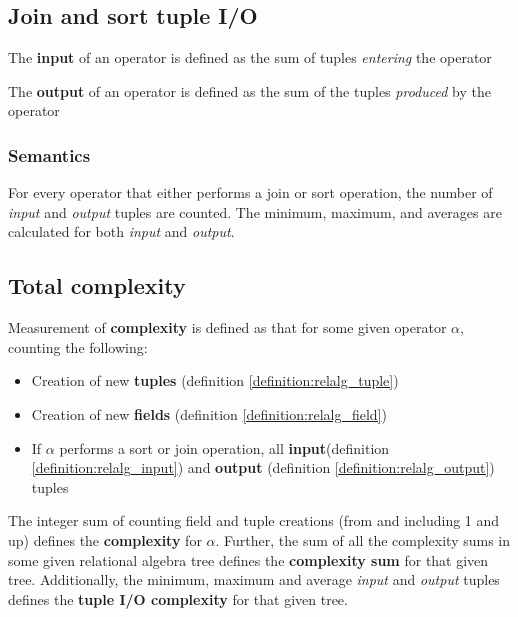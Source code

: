 \subsection{Join and sort tuple I/O}
\begin{myDefinition}
The \textbf{input} of an operator is defined as the sum of tuples \emph{entering} the
operator
\label{definition:relalg_input}
\end{myDefinition}

\begin{myDefinition}
The \textbf{output} of an operator is defined as the sum of the tuples \emph{produced}
by the operator
\label{definition:relalg_output}
\end{myDefinition}

\subsubsection{Semantics}
For every operator that either performs a join or sort operation, the number of
\textit{input} and \textit{output} tuples are counted. The minimum, maximum,
and averages are calculated for both \textit{input} and \textit{output}.

\subsection{Total complexity}
\begin{myDefinition}
Measurement of \textbf{complexity} is defined as that for some given
operator $\alpha$, counting the following:
\begin{itemize}
  \item Creation of new \textbf{tuples} (definition
  \ref{definition:relalg_tuple})
  \item Creation of new \textbf{fields} (definition
  \ref{definition:relalg_field})
  \item If $\alpha$ performs a sort or join operation, all
  \textbf{input}(definition \ref{definition:relalg_input}) and \textbf{output}
  (definition \ref{definition:relalg_output}) tuples
\end{itemize}
The integer sum of counting field and tuple creations (from and including 1 and
up) defines the \textbf{complexity} for $\alpha$. Further, the
sum of all the complexity sums in some given relational algebra tree defines the
\textbf{complexity sum} for that given tree. Additionally, the minimum, maximum
and average \textit{input} and \textit{output} tuples defines the
\textbf{tuple I/O complexity} for that given tree.
\label{definition:relalg_complexity}
\end{myDefinition}
